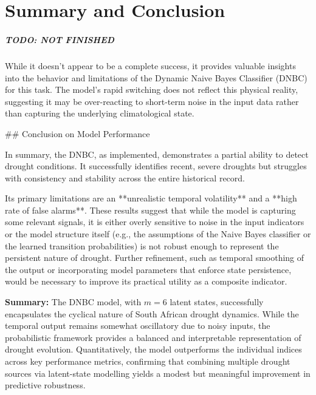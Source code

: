 \graphicspath{{conclusion/fig/}}

\chapter{Summary and Conclusion}
\label{chap:conclusion}

\paragraph{TODO: NOT FINISHED}
While it doesn't appear to be a complete success, it provides valuable insights into the behavior and limitations of the Dynamic Naive Bayes Classifier (DNBC) for this task.
 The model's rapid switching does not reflect this physical reality, suggesting it may be over-reacting to short-term noise in the input data rather than capturing the underlying climatological state.

## Conclusion on Model Performance

In summary, the DNBC, as implemented, demonstrates a partial ability to detect drought conditions. It successfully identifies recent, severe droughts but struggles with consistency and stability across the entire historical record.

Its primary limitations are an **unrealistic temporal volatility** and a **high rate of false alarms**. These results suggest that while the model is capturing some relevant signals, it is either overly sensitive to noise in the input indicators or the model structure itself (e.g., the assumptions of the Naive Bayes classifier or the learned transition probabilities) is not robust enough to represent the persistent nature of drought. Further refinement, such as temporal smoothing of the output or incorporating model parameters that enforce state persistence, would be necessary to improve its practical utility as a composite indicator.


\textbf{Summary:}  
The DNBC model, with $m = 6$ latent states, successfully encapsulates the cyclical nature of South African drought dynamics. While the temporal output remains somewhat oscillatory due to noisy inputs, the probabilistic framework provides a balanced and interpretable representation of drought evolution. Quantitatively, the model outperforms the individual indices across key performance metrics, confirming that combining multiple drought sources via latent-state modelling yields a modest but meaningful improvement in predictive robustness.
